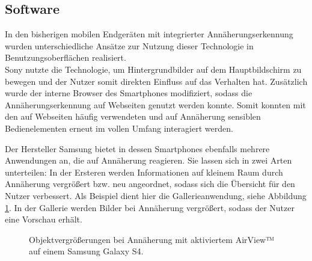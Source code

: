 \documentclass[a4paper,12pt,bibliography=totoc]{scrreprt}%
\begin{document}
\subsection{Software}
In den bisherigen mobilen Endgeräten mit integrierter Annäherungserkennung wurden unterschiedliche Ansätze zur Nutzung dieser Technologie in Benutzungsoberflächen realisiert.\\
Sony nutzte die Technologie, um Hintergrundbilder auf dem Hauptbildschirm zu bewegen und der Nutzer somit direkten Einfluss auf das Verhalten hat. Zusätzlich wurde der interne Browser des Smartphones modifiziert, sodass die Annäherungserkennung auf Webseiten genutzt werden konnte. Somit konnten mit den auf Webseiten häufig verwendeten und auf Annäherung sensiblen Bedienelementen erneut im vollen Umfang interagiert werden.

Der Hersteller Samsung bietet in dessen Smartphones ebenfalls mehrere Anwendungen an, die auf Annäherung reagieren. Sie lassen sich in zwei Arten unterteilen: In der Ersteren werden Informationen auf kleinem Raum durch Annäherung vergrößert bzw. neu angeordnet, sodass sich die Übersicht für den Nutzer verbessert. Als Beispiel dient hier die Gallerieanwendung, siehe Abbildung \ref{samsungeinleitung1}. In der Gallerie werden Bilder bei Annäherung vergrößert, sodass der Nutzer eine Vorschau erhält.

\begin{figure}
\hfill
{}
\caption{Objektvergrößerungen bei Annäherung mit aktiviertem AirView™ auf einem Samsung Galaxy S4.}
\label{samsungeinleitung1}
\end{figure}
\end{document}
